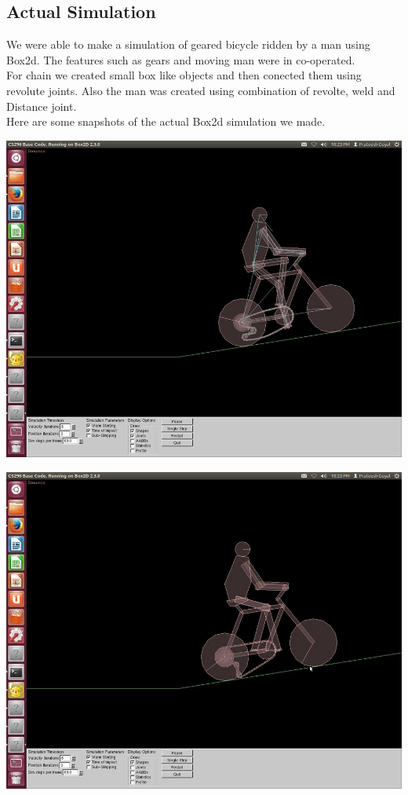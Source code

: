 \documentclass[11pt]{article}
\begin{document}
\subsection{Actual Simulation}
We were able to make a simulation of geared bicycle ridden by a man using Box2d. The features such as gears and moving man were in co-operated. \\
For chain we created small box like objects and then conected them using revolute joints. Also the man was created using combination of revolte, weld and Distance joint.\\
Here are some snapshots of the actual Box2d simulation we made.
	\begin{center}
	\includegraphics[scale=0.4]{pic1}
	\end{center}
	\begin{center}
	\includegraphics[scale=0.4]{pic2}
	\end{center}
\end{document}
